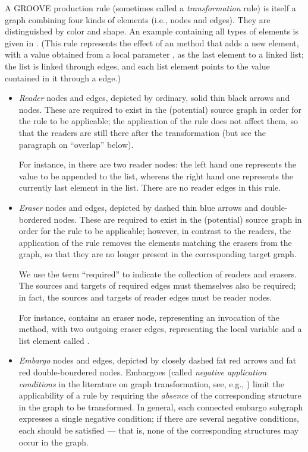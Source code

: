 A GROOVE production rule (sometimes called a \emph{transformation} rule) is
itself a graph combining four kinds of elements (i.e., nodes and edges). They
are distinguished by color and shape. An example containing all types of
elements is given in . (This rule represents the effect of an
\Append{} method that adds a new element, with a value obtained from a local
parameter \xx{}, as the last element to a linked list; the list is linked
through \Next{} edges, and each list element points to the value contained in
it through a \Val{} edge.)
%
%
\begin{itemize}
\item \emph{Reader} nodes and edges, depicted by ordinary, solid thin black arrows
  and nodes. These are required to exist in the (potential) source graph in
  order for the rule to be applicable; the application of the rule does not
  affect them, so that the readers are still there after the transformation
  (but see the paragraph on ``overlap'' below).
  
  For instance, in  there are two reader nodes: the left hand one
  represents the value to be appended to the list, whereas the right hand one
  represents the currently last element in the list. There are no reader edges in
  this rule.
  
\item \emph{Eraser} nodes and edges, depicted by dashed thin blue arrows and
  double-bordered nodes. These are required to exist in the (potential) source
  graph in order for the rule to be applicable; however, in contrast to the
  readers, the application of the rule removes the elements matching the
  erasers from the graph, so that they are no longer present in the
  corresponding target graph.
  
  We use the term ``required'' to indicate the collection of
  readers and erasers. The sources and targets of required edges must
  themselves also be required; in fact, the sources and targets of reader edges
  must be reader nodes.

  For instance,  contains an eraser node, representing an
  invocation of the \Append{} method, with two outgoing eraser edges,
  representing the local variable \xx{} and a list element called \This.
  
\item \emph{Embargo} nodes and edges, depicted by closely dashed fat red arrows
  and fat red double-bourdered nodes. Embargoes (called \emph{negative
  application conditions} in the literature on graph transformation, see, e.g.,
  \cite{HabelHecTae1996}) limit the applicability of a rule by requiring the
  \emph{absence} of the corresponding structure in the graph to be transformed.
  In general, each connected embargo subgraph expresses a single negative
  condition; if there are several negative conditions, each should be satisfied
  --- that is, none of the corresponding structures may occur in the graph.
  

\end{itemize}
